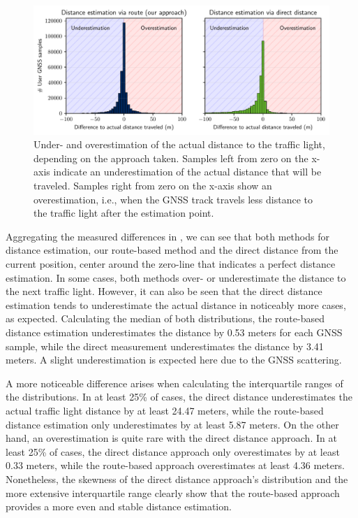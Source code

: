 \begin{figure}[t]
\centering 
\includegraphics[width=\linewidth]{images/routing-distance-distribution.pdf}
\caption{Under- and overestimation of the actual distance to the traffic light, depending on the approach taken. Samples left from zero on the x-axis indicate an underestimation of the actual distance that will be traveled. Samples right from zero on the x-axis show an overestimation, i.e., when the GNSS track travels less distance to the traffic light after the estimation point.}
\label{fig:routing-distance-distribution}
\end{figure}

Aggregating the measured differences in , we can see that both methods for distance estimation, our route-based method and the direct distance from the current position, center around the zero-line that indicates a perfect distance estimation. In some cases, both methods over- or underestimate the distance to the next traffic light. However, it can also be seen that the direct distance estimation tends to underestimate the actual distance in noticeably more cases, as expected. Calculating the median of both distributions, the route-based distance estimation underestimates the distance by 0.53 meters for each GNSS sample, while the direct measurement underestimates the distance by 3.41 meters. A slight underestimation is expected here due to the GNSS scattering.

A more noticeable difference arises when calculating the interquartile ranges of the distributions. In at least 25\% of cases, the direct distance underestimates the actual traffic light distance by at least 24.47 meters, while the route-based distance estimation only underestimates by at least 5.87 meters. On the other hand, an overestimation is quite rare with the direct distance approach. In at least 25\% of cases, the direct distance approach only overestimates by at least 0.33 meters, while the route-based approach overestimates at least 4.36 meters. Nonetheless, the skewness of the direct distance approach's distribution and the more extensive interquartile range clearly show that the route-based approach provides a more even and stable distance estimation.

